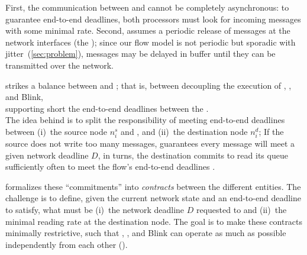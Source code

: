 First, the communication between \APs and \CPs cannot be completely asynchronous: to guarantee end-to-end deadlines, both processors must look for incoming messages with some minimal rate.
%
Second, \blink assumes a periodic release of messages at the network interfaces (\ie the \CPs); since our flow model is not periodic but sporadic with jitter~(\cref{sec:problem}), messages may be delayed in \CPs buffer until they can be transmitted over the network.

\DRP strikes a balance between   and ; that is, between
\linebreak
\inlineitem decoupling the execution of \APs, \CPs, and Blink, \\
\inlineitem supporting short the end-to-end deadlines between the \APs.\\
The idea behind \DRP is to split the responsibility of meeting end-to-end deadlines between (i)~the source node $n^s_i$ and \blink, and (ii)~the destination node $n^d_i$;
If the source does not write too many messages, \blink guarantees every message will meet a given network deadline $D$, in turns, the destination commits to read its \bolt queue sufficiently often to meet the flow's end-to-end deadlines \deadlineany.

\DRP formalizes these ``commitments'' into \emph{contracts} between the different entities. The challenge is to define, given the current network state and an end-to-end deadline \deadlineany to satisfy, what must be
  (i)~the network deadline $D$ requested to \blink and
  (ii)~the minimal reading rate at the destination node.
The goal is to make these contracts minimally restrictive, such that \APs, \CPs, and Blink can operate as much as possible independently from each other ().
